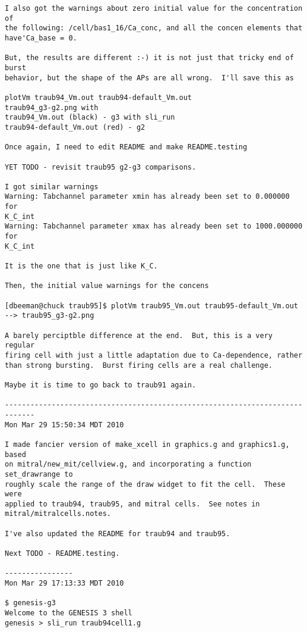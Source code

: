 \documentclass[12pt]{article}
\begin{document}
\begin{verbatim}
I also got the warnings about zero initial value for the concentration of
the following: /cell/bas1_16/Ca_conc, and all the concen elements that
have'Ca_base = 0.

But, the results are different :-) it is not just that tricky end of burst
behavior, but the shape of the APs are all wrong.  I'll save this as

plotVm traub94_Vm.out traub94-default_Vm.out
traub94_g3-g2.png with
traub94_Vm.out (black) - g3 with sli_run
traub94-default_Vm.out (red) - g2

Once again, I need to edit README and make README.testing

YET TODO - revisit traub95 g2-g3 comparisons.

I got similar warnings
Warning: Tabchannel parameter xmin has already been set to 0.000000 for
K_C_int
Warning: Tabchannel parameter xmax has already been set to 1000.000000 for
K_C_int

It is the one that is just like K_C.

Then, the initial value warnings for the concens

[dbeeman@chuck traub95]$ plotVm traub95_Vm.out traub95-default_Vm.out
--> traub95_g3-g2.png

A barely perciptble difference at the end.  But, this is a very regular
firing cell with just a little adaptation due to Ca-dependence, rather
than strong bursting.  Burst firing cells are a real challenge.

Maybe it is time to go back to traub91 again.

-----------------------------------------------------------------------------
Mon Mar 29 15:50:34 MDT 2010

I made fancier version of make_xcell in graphics.g and graphics1.g, based
on mitral/new_mit/cellview.g, and incorporating a function set_drawrange to
roughly scale the range of the draw widget to fit the cell.  These were
applied to traub94, traub95, and mitral cells.	See notes in
mitral/mitralcells.notes.

I've also updated the README for traub94 and traub95.

Next TODO - README.testing.

----------------
Mon Mar 29 17:13:33 MDT 2010

$ genesis-g3
Welcome to the GENESIS 3 shell
genesis > sli_run traub94cell1.g


\end{verbatim}
\end{document}
